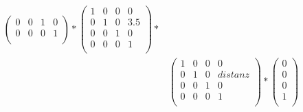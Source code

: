 \documentclass[a4paper,11pt,DIV11]{scrartcl}
\begin{document}
\begin{align}
\begin{pmatrix}
0 & 0 & 1 & 0 \\
0 & 0 & 0 & 1 \\
\end{pmatrix}
*
\begin{pmatrix}
1 & 0 & 0 & 0 \\
0 & 1 & 0 & 3.5 \\
0 & 0 & 1 & 0 \\
0 & 0 & 0 & 1 \\
\end{pmatrix}
* \\ &
\begin{pmatrix}
1 & 0 & 0 & 0 \\
0 & 1 & 0 & distanz \\
0 & 0 & 1 & 0 \\
0 & 0 & 0 & 1 \\
\end{pmatrix}
*
\begin{pmatrix}
0 \\
0 \\
0 \\
1 \\
\end{pmatrix}
\end{align}
\end{document}
